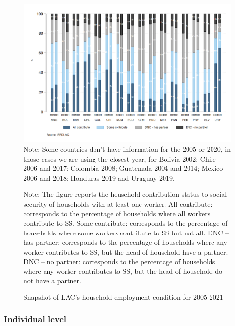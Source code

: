 \documentclass[english]{article}
\begin{document}
\begin{figure}[!htb]
    \centering
     \caption{Snapshot of LAC’s household employment condition for 2005-2021}     
     \includegraphics[scale=.3]{latex/figures/Household/snapshot_household_2005-2021.png}
    \label{fig:Household20052021}
    \footnotesize{Note: Some countries don’t have information for the 2005 or 2020, in those cases we are using the closest year, for Bolivia 2002; Chile 2006 and 2017; Colombia 2008; Guatemala 2004 and 2014; Mexico 2006 and 2018; Honduras 2019 and Uruguay 2019.}
 
        
    \footnotesize{Note: The figure reports the household contribution status to social security of households with at least one worker.   All contribute: corresponds to the percentage of households where all workers contribute to SS. Some contribute: corresponds to the percentage of households where some workers contribute to SS but not all. DNC – has partner: corresponds to the percentage of households where any worker contributes to SS, but the head of household have a partner. DNC – no partner: corresponds to the percentage of households where any worker contributes to SS, but the head of household do not have a partner. }
\end{figure}

\subsubsection{Individual level} %
\end{document}
